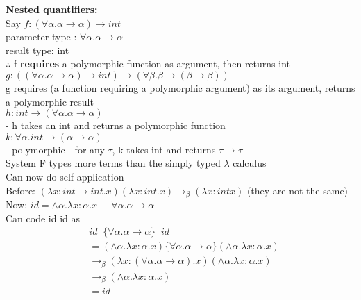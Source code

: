 \documentclass[11pt]{article}
\begin{document}
{\bf Nested quantifiers:} \\

Say $f:(\forall \alpha.\alpha \rightarrow \alpha) \rightarrow int$ \\

parameter type : $\forall \alpha.\alpha \rightarrow \alpha$ \\

result type: int \\

$\therefore$ f {\bf requires} a polymorphic function as argument, then returns int \\

$g: ((\forall \alpha.\alpha \rightarrow \alpha) \rightarrow int) \rightarrow (\forall \beta.\beta \rightarrow (\beta \rightarrow \beta))$ \\

g requires (a function requiring a polymorphic argument) as its argument, returns a polymorphic result \\

$h: int \rightarrow (\forall \alpha.\alpha \rightarrow \alpha)$ \\

- h takes an int and returns a polymorphic function \\

$k: \forall \alpha. int \rightarrow (\alpha \rightarrow \alpha)$ \\

- polymorphic - for any $\tau$, k takes int and returns $\tau \rightarrow \tau$ \\

System F types more terms than the simply typed $\lambda$ calculus \\

Can now do self-application \\

Before: $(\lambda x:int \rightarrow int.x) (\lambda x:int.x) \rightarrow_\beta (\lambda x:int x)$ (they are not the same) \\

Now: $id = \land \alpha.\lambda x:\alpha.x$   $\;\;\;\; \forall \alpha.\alpha \rightarrow \alpha$ \\

Can code id id as 
\begin{align*}
&id\;\;\{\forall \alpha.\alpha \rightarrow \alpha\}\;\; id \\
&= (\land \alpha.\lambda x:\alpha.x)\{\forall \alpha.\alpha \rightarrow \alpha\} (\land \alpha.\lambda x:\alpha.x) \\
&\rightarrow_\beta (\lambda x:(\forall \alpha.\alpha \rightarrow \alpha).x) (\land \alpha.\lambda x:\alpha.x) \\
&\rightarrow_\beta (\land \alpha.\lambda x:\alpha.x) \\
&= id
\end{align*}
\end{document}
